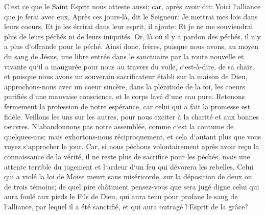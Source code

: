 \verse C`est ce que le Saint Esprit nous atteste aussi; car, après avoir dit: 
\verse Voici l`alliance que je ferai avec eux, Après ces jours-là, dit le Seigneur: Je mettrai mes lois dans leurs coeurs, Et je les écrirai dans leur esprit, il ajoute: 
\verse Et je ne me souviendrai plus de leurs péchés ni de leurs iniquités. 
\verse Or, là où il y a pardon des péchés, il n`y a plus d`offrande pour le péché. 
\verse Ainsi donc, frères, puisque nous avons, au moyen du sang de Jésus, une libre entrée dans le sanctuaire 
\verse par la route nouvelle et vivante qu`il a inaugurée pour nous au travers du voile, c`est-à-dire, de sa chair, 
\verse et puisque nous avons un souverain sacrificateur établi sur la maison de Dieu, 
\verse approchons-nous avec un coeur sincère, dans la plénitude de la foi, les coeurs purifiés d`une mauvaise conscience, et le corps lavé d`une eau pure. 
\verse Retenons fermement la profession de notre espérance, car celui qui a fait la promesse est fidèle. 
\verse Veillons les uns sur les autres, pour nous exciter à la charité et aux bonnes oeuvres. 
\verse N`abandonnons pas notre assemblée, comme c`est la coutume de quelques-uns; mais exhortons-nous réciproquement, et cela d`autant plus que vous voyez s`approcher le jour. 
\verse Car, si nous péchons volontairement après avoir reçu la connaissance de la vérité, il ne reste plus de sacrifice pour les péchés, 
\verse mais une attente terrible du jugement et l`ardeur d`un feu qui dévorera les rebelles. 
\verse Celui qui a violé la loi de Moïse meurt sans miséricorde, sur la déposition de deux ou de trois témoins; 
\verse de quel pire châtiment pensez-vous que sera jugé digne celui qui aura foulé aux pieds le Fils de Dieu, qui aura tenu pour profane le sang de l`alliance, par lequel il a été sanctifié, et qui aura outragé l`Esprit de la grâce? 
